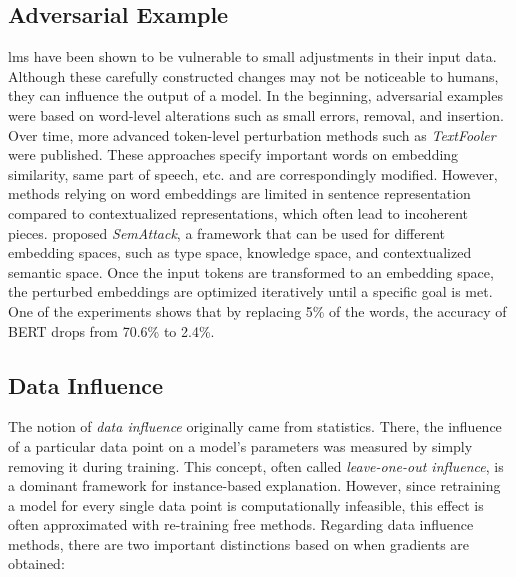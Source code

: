 \subsection{Adversarial Example}
\acrlong{lm}s have been shown to be vulnerable to small adjustments in their input data. Although these carefully constructed changes may not be noticeable to humans, they can influence the output of a model. In the beginning, adversarial examples were based on word-level alterations such as small errors, removal, and insertion. Over time, more advanced token-level perturbation methods such as \textit{TextFooler}~\cite{DBLP:conf/aaai/JinJZS20} were published. These approaches specify important words on embedding similarity, same part of speech, etc. and are correspondingly modified. However, methods relying on word embeddings are limited in sentence representation compared to contextualized representations, which often lead to incoherent pieces.
\cite{DBLP:conf/naacl/WangXLCL22} proposed \textit{SemAttack}, a framework that can be used for different embedding spaces, such as type space, knowledge space, and contextualized semantic space. Once the input tokens are transformed to an embedding space, the perturbed embeddings are optimized iteratively until a specific goal is met. One of the experiments shows that by replacing 5\% of the words, the accuracy of BERT drops from 70.6\% to 2.4\%.

\subsection{Data Influence} \label{subsec:data_influence}
The notion of \textit{data influence} originally came from statistics. There, the influence of a particular data point on a model's parameters was measured by simply removing it during training. This concept, often called \textit{leave-one-out influence}, is a dominant framework for instance-based explanation. However, since retraining a model for every single data point is computationally infeasible, this effect is often approximated with re-training free methods. Regarding data influence methods, there are two important distinctions based on when gradients are obtained:
